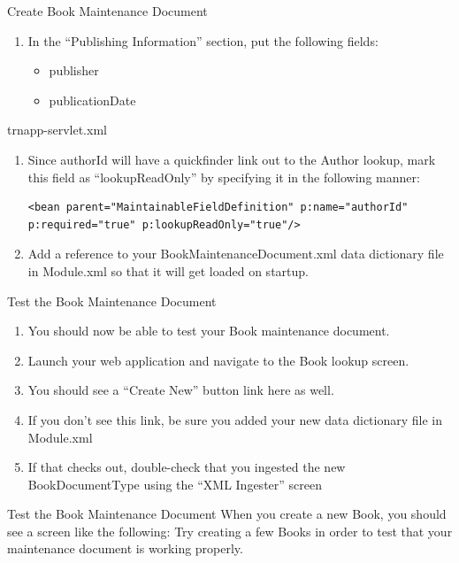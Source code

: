 \documentclass[xcolor=dvipsnames,14pt,professionalfonts]{beamer}
\begin{document}
\begin{frame}{Create Book Maintenance Document}
  \begin{enumerate}
  \item In the “Publishing Information” section, put the following fields:
      \begin{itemize}
      \item publisher
      \item publicationDate
\end{itemize}
  \end{enumerate}
\end{frame}
 
\begin{frame}[fragile]{trnapp-servlet.xml}
  \begin{enumerate}
  \item  Since authorId will have a quickfinder link out to the Author lookup, mark this field as “lookupReadOnly” by specifying it in the following manner:
    \begin{verbatim}
<bean parent="MaintainableFieldDefinition" p:name="authorId" p:required="true" p:lookupReadOnly="true"/>
\end{verbatim}
\item Add a reference to your BookMaintenanceDocument.xml data
  dictionary file in Module.xml so that it will get loaded on startup.
  \end{enumerate}
\end{frame}

\begin{frame}{Test the Book Maintenance Document}
  \begin{enumerate}
  \item You should now be able to test your Book maintenance document.
  \item Launch your web application and navigate to the Book lookup screen.
  \item You should see a “Create New” button link here as well.
  \item If you don’t see this link, be sure you added your new data dictionary file in Module.xml
  \item If that checks out, double-check that you ingested the new BookDocumentType using the “XML Ingester” screen
    \end{enumerate}
  \end{frame}

\begin{frame}{Test the Book Maintenance Document}
   When you create a new Book, you should see a screen like the
    following:
    Try creating a few Books in order to test that your maintenance document is working properly.
  \end{frame}
\end{document}
